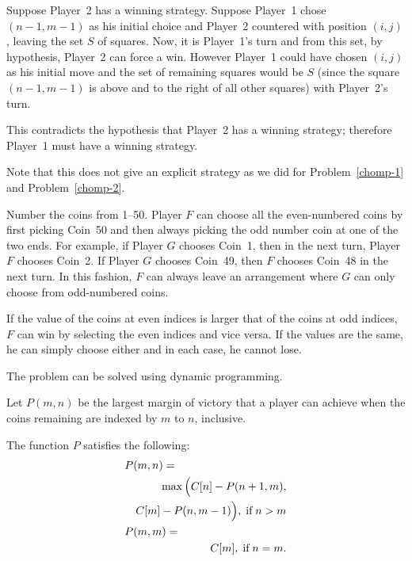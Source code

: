 Suppose Player~2 has a winning strategy. Suppose Player~1 chose $(n-1,m-1)$ as
his initial choice and Player~2 countered with position $(i,j)$, leaving the set $S$ of squares.
Now, it is Player~1's turn and from this set, by hypothesis, Player~2 can force a win.  However Player~1 could have chosen $(i,j)$ as his initial
move and the set of remaining squares would be $S$ (since the square $(n-1,m-1)$ is above and to the right of all
other squares) with Player~2's turn.

This contradicts the hypothesis that Player~2 has a winning strategy; therefore Player~1 must have a winning strategy.

Note that this does not give an explicit strategy as we did for
Problem~\ref{chomp-1} and Problem~\ref{chomp-2}.

Number the coins from 1--50.
Player $F$ can choose all the even-numbered coins by first picking Coin~50 and then always picking the odd number coin at one of the two ends. For example, if Player $G$ chooses Coin~1, then in the next turn, Player $F$ chooses Coin~2. If Player $G$ chooses Coin~49, then $F$ chooses Coin~48 in the next turn. In this fashion, $F$ can always leave an arrangement where $G$ can only choose from odd-numbered coins.

If the value of the coins at even indices is larger that of the coins at odd indices,
$F$ can win by selecting the even indices and vice versa.  If the values
are the same, he can simply choose either and in each case, he cannot lose.



The problem can be solved using dynamic programming.


Let $P(m,n)$ be the largest margin of victory that
a player can achieve when the coins remaining are indexed by $m$ to $n$, inclusive.

The function $P$ satisfies the following:
{
\begin{eqnarray*}
\lefteqn{P(m,n)  = } \\
& & \max\Big(C[n] - P(n+1,m), \\
& & C[m] - P(n,m -1)\Big), \; \mbox{if} \; n > m \\
\lefteqn{P(m,m)  =  } \\
& & C[m], \; \mbox{if} \; n = m.
\end{eqnarray*}
}


